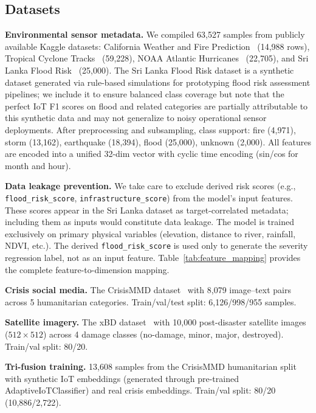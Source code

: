 \documentclass[journal]{IEEEtran}
\begin{document}
\subsection{Datasets}

\textbf{Environmental sensor metadata.} We compiled 63,527 samples from publicly available Kaggle datasets: California Weather and Fire Prediction~\cite{kaggle_fire} (14,988 rows), Tropical Cyclone Tracks~\cite{kaggle_cyclone_tracks} (59,228), NOAA Atlantic Hurricanes~\cite{kaggle_storm_atl} (22,705), and Sri Lanka Flood Risk~\cite{kaggle_srilanka_flood} (25,000). The Sri Lanka Flood Risk dataset is a synthetic dataset generated via rule-based simulations for prototyping flood risk assessment pipelines; we include it to ensure balanced class coverage but note that the perfect IoT F1 scores on flood and related categories are partially attributable to this synthetic data and may not generalize to noisy operational sensor deployments. After preprocessing and subsampling, class support: fire (4,971), storm (13,162), earthquake (18,394), flood (25,000), unknown (2,000). All features are encoded into a unified 32-dim vector with cyclic time encoding (sin/cos for month and hour).

\textbf{Data leakage prevention.} We take care to exclude derived risk scores (e.g., \texttt{flood\_risk\_score}, \texttt{infrastructure\_score}) from the model's input features. These scores appear in the Sri Lanka dataset as target-correlated metadata; including them as inputs would constitute data leakage. The model is trained exclusively on primary physical variables (elevation, distance to river, rainfall, NDVI, etc.). The derived \texttt{flood\_risk\_score} is used only to generate the severity regression label, not as an input feature. Table~\ref{tab:feature_mapping} provides the complete feature-to-dimension mapping.

\textbf{Crisis social media.} The CrisisMMD dataset~\cite{alam2018crisismmd} with 8,079 image--text pairs across 5 humanitarian categories. Train/val/test split: 6,126/998/955 samples.

\textbf{Satellite imagery.} The xBD dataset~\cite{gupta2019xbd} with 10,000 post-disaster satellite images ($512 \times 512$) across 4 damage classes (no-damage, minor, major, destroyed). Train/val split: 80/20.

\textbf{Tri-fusion training.} 13,608 samples from the CrisisMMD humanitarian split with synthetic IoT embeddings (generated through pre-trained AdaptiveIoTClassifier) and real crisis embeddings. Train/val split: 80/20 (10,886/2,722).
\end{document}
